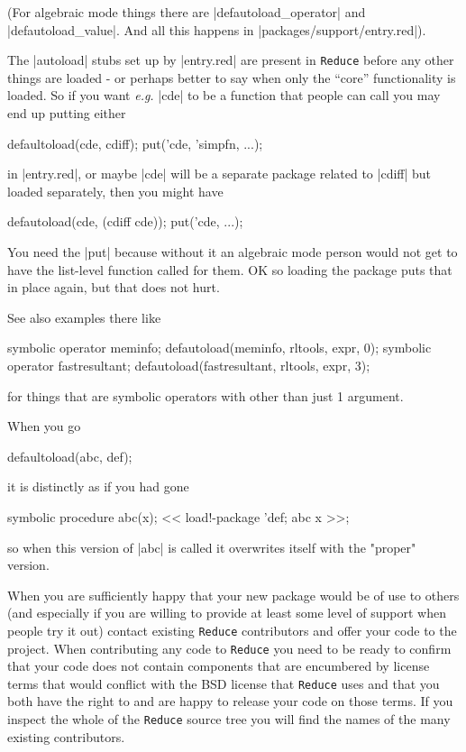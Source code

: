 \documentclass[12pt,twoside,openright]{memoir}
\newcommand{\reduce}{\texttt{Reduce}\xspace}
\begin{document}
(For algebraic mode things there are |defautoload_operator| and
|defautoload_value|. And all this happens in |packages/support/entry.red|).

The |autoload| stubs set up by |entry.red| are present in \reduce before any
other things are loaded - or perhaps better to say when only the ``core''
functionality is loaded. So if you want \emph{e.g.} |cde| to be a function that
people can call you may end up putting either
\begin{rlispverb}
  defaultoload(cde, cdiff);
  put('cde, 'simpfn, ...);
\end{rlispverb}
in |entry.red|, or maybe |cde| will be a separate package related to |cdiff|
but loaded separately, then you might have
\begin{rlispverb}
  defautoload(cde, (cdiff cde));
  put('cde, ...);
\end{rlispverb}
You need the |put| because without it an algebraic mode person
would not get to have the list-level function called for them. OK so loading
the package puts that in place again, but that does not hurt.

See also examples there like
\begin{rlispverb}
  symbolic operator meminfo;
  defautoload(meminfo, rltools, expr, 0);
  symbolic operator fastresultant;
  defautoload(fastresultant, rltools, expr, 3);
\end{rlispverb}
for things that are symbolic operators with other than just 1 argument.

When you go
\begin{rlispverb}
  defaultoload(abc, def);
\end{rlispverb}
it is distinctly as if you had gone
\begin{rlispverb}
  symbolic procedure abc(x);
  << load!-package 'def; %
  abc x >>; %
\end{rlispverb}
so when this version of |abc| is called it overwrites itself with the "proper"
version.

When you are sufficiently happy that your new package would be of use
to others (and especially if you are willing to provide at least some
level of support when people try it out) contact existing \reduce
contributors and offer your code to the project. When contributing any
code to \reduce you need to be ready to confirm that your code does not
contain components that are encumbered by license terms that would
conflict with the BSD license that \reduce uses and that you both have the
right to and are happy to release your code on those terms. If you inspect
the whole of the \reduce source tree you will find the names of the
many existing contributors.
\end{document}
